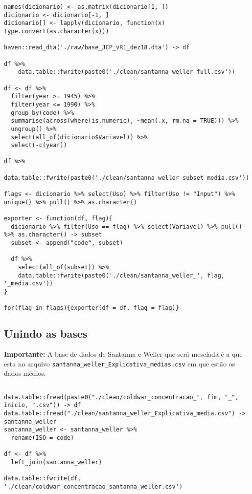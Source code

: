 \documentclass[11pt]{article}
\begin{document}
\begin{verbatim}
names(dicionario) <- as.matrix(dicionario[1, ])
dicionario <- dicionario[-1, ]
dicionario[] <- lapply(dicionario, function(x) type.convert(as.character(x)))

haven::read_dta('./raw/base_JCP_vR1_dez18.dta') -> df

df %>%
    data.table::fwrite(paste0('./clean/santanna_weller_full.csv'))
    
df <- df %>%
  filter(year >= 1945) %>%
  filter(year <= 1990) %>%
  group_by(code) %>%
  summarise(across(where(is.numeric), ~mean(.x, rm.na = TRUE))) %>%
  ungroup() %>%
  select(all_of(dicionario$Variavel)) %>%
  select(-c(year))

df %>%
    data.table::fwrite(paste0('./clean/santanna_weller_subset_media.csv'))

flags <- dicionario %>% select(Uso) %>% filter(Uso != "Input") %>% unique() %>% pull() %>% as.character()

exporter <- function(df, flag){
  dicionario %>% filter(Uso == flag) %>% select(Variavel) %>% pull() %>% as.character() -> subset
  subset <- append("code", subset)
  
  df %>%
    select(all_of(subset)) %>%
    data.table::fwrite(paste0('./clean/santanna_weller_', flag, '_media.csv'))
}

for(flag in flags){exporter(df = df, flag = flag)}

\end{verbatim}



\subsection*{Unindo as bases}
\label{sec:orge002732}

\textbf{Importante:} A base de dados de Santanna e Weller que será mesclada é a que esta no arquivo \texttt{santanna\_weller\_Explicativa\_medias.csv} em que estão os dados médios.

\begin{verbatim}

data.table::fread(paste0("./clean/coldwar_concentracao_", fim, "_", inicio, ".csv")) -> df
data.table::fread("./clean/santanna_weller_Explicativa_media.csv") -> santanna_weller
santanna_weller <- santanna_weller %>%
  rename(ISO = code)

df <- df %>%
  left_join(santanna_weller)

data.table::fwrite(df, './clean/coldwar_concentracao_santanna_weller.csv')
    
\end{verbatim}
\end{document}
